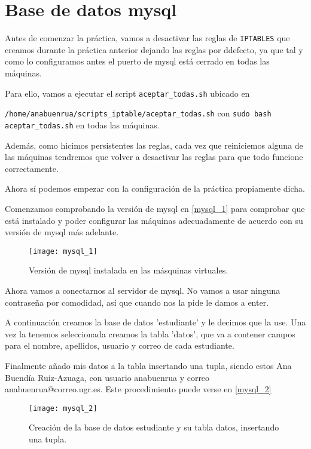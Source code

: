 
\chapter{Base de datos mysql}

Antes de comenzar la práctica, vamos a desactivar las reglas de \verb|IPTABLES| que creamos durante la práctica anterior dejando las reglas por ddefecto, ya que tal y como lo configuramos antes el puerto de mysql está cerrado en todas las máquinas.

Para ello, vamos a ejecutar el script \verb|aceptar_todas.sh| ubicado en 

\verb|/home/anabuenrua/scripts_iptable/aceptar_todas.sh| con \verb|sudo bash aceptar_todas.sh| en todas las máquinas.

Además, como hicimos persistentes las reglas, cada vez que reiniciemos alguna de las máquinas tendremos que volver a desactivar las reglas para que todo funcione correctamente.

Ahora sí podemos empezar con la configuración de la práctica propiamente dicha.

Comenzamos comprobando la versión de mysql en \eqref{mysql_1} para comprobar que está instalado y poder configurar las máquinas adecuadamente de acuerdo con su versión de mysql más adelante.

\begin{figure}[h!]
\begin{center}
\caption{Versión de mysql instalada en las másquinas virtuales.}
\label{mysql_1}
\texttt{[image: mysql\_1]}
\end{center}
\end{figure}

Ahora vamos a conectarnos al servidor de mysql. No vamos a usar ninguna contraseña por comodidad, así que cuando nos la pide le damos a enter.

A continuación creamos la base de datos 'estudiante' y le decimos que la use. Una vez la tenemos seleccionada creamos la tabla 'datos', que va a contener campos para el nombre, apellidos, usuario y correo de cada estudiante.

Finalmente añado mis datos a la tabla insertando una tupla, siendo estos Ana Buendía Ruiz-Azuaga, con usuario anabuenrua y correo anabuenrua@correo.ugr.es. Este procedimiento puede verse en \eqref{mysql_2}

\begin{figure}[h!]
\begin{center}
\caption{Creación de la base de datos estudiante y su tabla datos, insertando una tupla.}
\label{mysql_2}
\texttt{[image: mysql\_2]}
\end{center}
\end{figure}


